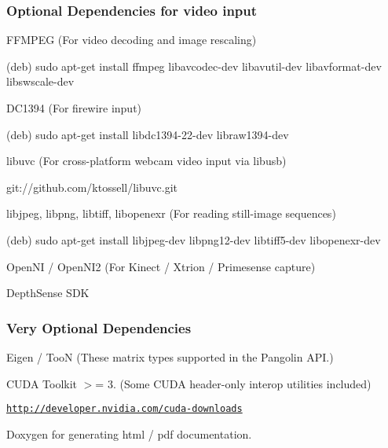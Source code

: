 \subsubsection*{Optional Dependencies for video input}


\begin{DoxyItemize}
\item F\+F\+M\+P\+EG (For video decoding and image rescaling)
\begin{DoxyItemize}
\item (deb) sudo apt-\/get install ffmpeg libavcodec-\/dev libavutil-\/dev libavformat-\/dev libswscale-\/dev
\end{DoxyItemize}
\item D\+C1394 (For firewire input)
\begin{DoxyItemize}
\item (deb) sudo apt-\/get install libdc1394-\/22-\/dev libraw1394-\/dev
\end{DoxyItemize}
\item libuvc (For cross-\/platform webcam video input via libusb)
\begin{DoxyItemize}
\item git\+://github.com/ktossell/libuvc.\+git
\end{DoxyItemize}
\item libjpeg, libpng, libtiff, libopenexr (For reading still-\/image sequences)
\begin{DoxyItemize}
\item (deb) sudo apt-\/get install libjpeg-\/dev libpng12-\/dev libtiff5-\/dev libopenexr-\/dev
\end{DoxyItemize}
\item Open\+NI / Open\+N\+I2 (For Kinect / Xtrion / Primesense capture)
\item Depth\+Sense S\+DK
\end{DoxyItemize}

\subsubsection*{Very Optional Dependencies}


\begin{DoxyItemize}
\item Eigen / TooN (These matrix types supported in the Pangolin A\+PI.)
\item C\+U\+DA Toolkit $>$= 3. (Some C\+U\+DA header-\/only interop utilities included)
\begin{DoxyItemize}
\item \href{http://developer.nvidia.com/cuda-downloads}{\tt http\+://developer.\+nvidia.\+com/cuda-\/downloads}
\end{DoxyItemize}
\item Doxygen for generating html / pdf documentation.
\end{DoxyItemize}

